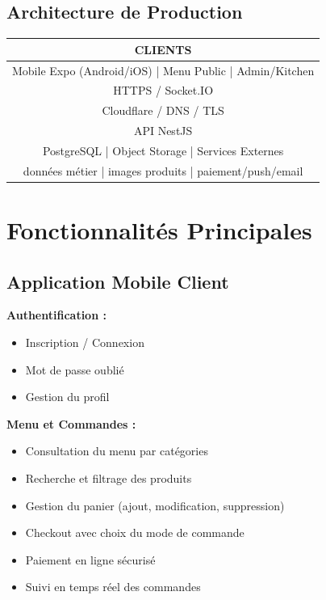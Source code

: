 \documentclass[11pt,a4paper]{article}
\begin{document}
\subsection{Architecture de Production}

\begin{center}
\begin{tabular}{c}
\textbf{CLIENTS} \\
\hline
Mobile Expo (Android/iOS) | Menu Public | Admin/Kitchen \\
\hline
HTTPS / Socket.IO \\
\hline
Cloudflare / DNS / TLS \\
\hline
API NestJS \\
\hline
PostgreSQL | Object Storage | Services Externes \\
données métier | images produits | paiement/push/email \\
\end{tabular}
\end{center}

\section{Fonctionnalités Principales}

\subsection{Application Mobile Client}

\textbf{Authentification :}
\begin{itemize}
    \item Inscription / Connexion
    \item Mot de passe oublié
    \item Gestion du profil
\end{itemize}

\textbf{Menu et Commandes :}
\begin{itemize}
    \item Consultation du menu par catégories
    \item Recherche et filtrage des produits
    \item Gestion du panier (ajout, modification, suppression)
    \item Checkout avec choix du mode de commande
    \item Paiement en ligne sécurisé
    \item Suivi en temps réel des commandes
\end{itemize}
\end{document}
